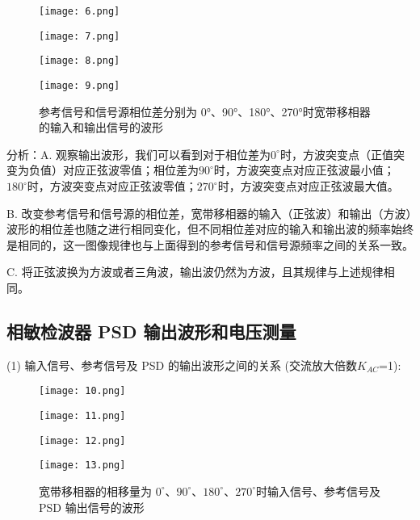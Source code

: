 \documentclass{whureport}
\begin{document}
\begin{multicols}{2}
\begin{figure}[H]
    \centering
    \texttt{[image: 6.png]}
    \label{example}
\end{figure}
\begin{figure}[H]
    \centering
    \texttt{[image: 7.png]}
    \label{example}
\end{figure}
\begin{figure}[H]
    \centering
    \texttt{[image: 8.png]}
    \label{example}
\end{figure}
\begin{figure}[H]
    \centering
    \texttt{[image: 9.png]}
    \caption{参考信号和信号源相位差分别为 0°、90°、180°、270°时宽带移相器的输入和输出信号的波形}	
    \label{example}
\end{figure}

分析：A. 观察输出波形，我们可以看到对于相位差为$0^\circ$时，方波突变点（正值突变为负值）对应正弦波零值；相位差为$90^\circ$时，方波突变点对应正弦波最小值；$180^\circ$时，方波突变点对应正弦波零值；$270^\circ$时，方波突变点对应正弦波最大值。

B. 改变参考信号和信号源的相位差，宽带移相器的输入（正弦波）和输出（方波）波形的相位差也随之进行相同变化，但不同相位差对应的输入和输出波的频率始终是相同的，这一图像规律也与上面得到的参考信号和信号源频率之间的关系一致。

C. 将正弦波换为方波或者三角波，输出波仍然为方波，且其规律与上述规律相同。

\subsection{相敏检波器 PSD 输出波形和电压测量}

(1) 输入信号、参考信号及 PSD 的输出波形之间的关系 (交流放大倍数$K_{AC}$=1):

\begin{figure}[H]
    \centering
    \texttt{[image: 10.png]}
    \label{example}
\end{figure}
\begin{figure}[H]
    \centering
    \texttt{[image: 11.png]}
    \label{example}
\end{figure}
\begin{figure}[H]
    \centering
    \texttt{[image: 12.png]}
    \label{example}
\end{figure}
\begin{figure}[H]
    \centering
    \texttt{[image: 13.png]}
    \caption{宽带移相器的相移量为 $0^\circ$、$90^\circ$、$180^\circ$、$270^\circ$时输入信号、参考信号及 PSD 输出信号的波形}	
    \label{example}
\end{figure}


\end{multicols}
\end{document}
